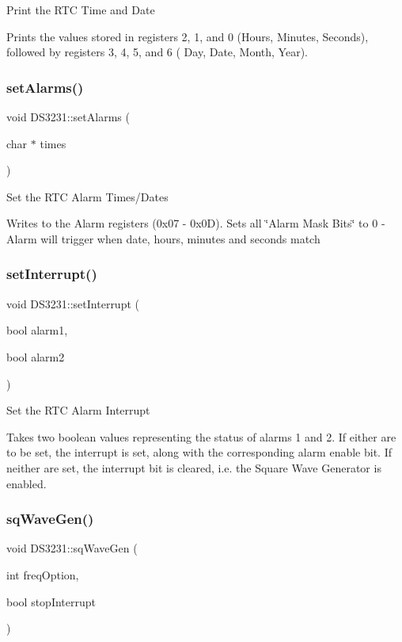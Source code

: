 Print the R\+TC Time and Date

Prints the values stored in registers 2, 1, and 0 (Hours, Minutes, Seconds), followed by registers 3, 4, 5, and 6 ( Day, Date, Month, Year).\mbox{\label{classDS3231_a78d2a067addcb2b5a43962e6442ca060}} 
\subsubsection{\texorpdfstring{set\+Alarms()}{setAlarms()}}
{\footnotesize\ttfamily void D\+S3231\+::set\+Alarms (\begin{DoxyParamCaption}\item[{char $\ast$}]{times }\end{DoxyParamCaption})}

Set the R\+TC Alarm Times/\+Dates

Writes to the Alarm registers (0x07 -\/ 0x0D). Sets all \char`\"{}\+Alarm Mask Bits\char`\"{} to 0 -\/ Alarm will trigger when date, hours, minutes and seconds match\mbox{\label{classDS3231_a43d0b34f3adb3abd8529ccafb23b3c66}} 
\subsubsection{\texorpdfstring{set\+Interrupt()}{setInterrupt()}}
{\footnotesize\ttfamily void D\+S3231\+::set\+Interrupt (\begin{DoxyParamCaption}\item[{bool}]{alarm1,  }\item[{bool}]{alarm2 }\end{DoxyParamCaption})}

Set the R\+TC Alarm Interrupt

Takes two boolean values representing the status of alarms 1 and 2. If either are to be set, the interrupt is set, along with the corresponding alarm enable bit. If neither are set, the interrupt bit is cleared, i.\+e. the Square Wave Generator is enabled.\mbox{\label{classDS3231_a0a56ae678b3708a07e3d8878774b42a8}} 
\subsubsection{\texorpdfstring{sq\+Wave\+Gen()}{sqWaveGen()}}
{\footnotesize\ttfamily void D\+S3231\+::sq\+Wave\+Gen (\begin{DoxyParamCaption}\item[{int}]{freq\+Option,  }\item[{bool}]{stop\+Interrupt }\end{DoxyParamCaption})}

